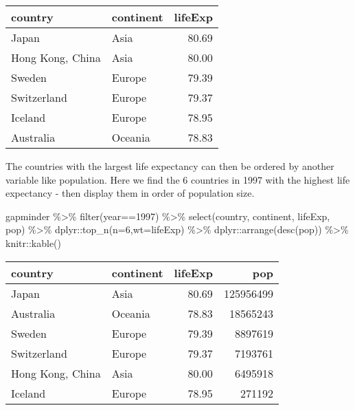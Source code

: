 \documentclass[
]{book}
\newenvironment{Shaded}{\begin{snugshade}}{\end{snugshade}}
\newcommand{\AttributeTok}[1]{\textcolor[rgb]{0.77,0.63,0.00}{#1}}
\newcommand{\DecValTok}[1]{\textcolor[rgb]{0.00,0.00,0.81}{#1}}
\newcommand{\FunctionTok}[1]{\textcolor[rgb]{0.00,0.00,0.00}{#1}}
\newcommand{\NormalTok}[1]{#1}
\newcommand{\SpecialCharTok}[1]{\textcolor[rgb]{0.00,0.00,0.00}{#1}}
\begin{document}
\begin{tabular}{l|l|r}
\hline
country & continent & lifeExp\\
\hline
Japan & Asia & 80.69\\
\hline
Hong Kong, China & Asia & 80.00\\
\hline
Sweden & Europe & 79.39\\
\hline
Switzerland & Europe & 79.37\\
\hline
Iceland & Europe & 78.95\\
\hline
Australia & Oceania & 78.83\\
\hline
\end{tabular}

The countries with the largest life expectancy can then be ordered by another variable like population. Here we find the 6 countries in 1997 with the highest life expectancy - then display them in order of population size.

\begin{Shaded}
\begin{Highlighting}[]
\NormalTok{gapminder }\SpecialCharTok{\%\textgreater{}\%} 
  \FunctionTok{filter}\NormalTok{(year}\SpecialCharTok{==}\DecValTok{1997}\NormalTok{) }\SpecialCharTok{\%\textgreater{}\%}  
  \FunctionTok{select}\NormalTok{(country, continent, lifeExp, pop) }\SpecialCharTok{\%\textgreater{}\%}
\NormalTok{  dplyr}\SpecialCharTok{::}\FunctionTok{top\_n}\NormalTok{(}\AttributeTok{n=}\DecValTok{6}\NormalTok{,}\AttributeTok{wt=}\NormalTok{lifeExp) }\SpecialCharTok{\%\textgreater{}\%}
\NormalTok{  dplyr}\SpecialCharTok{::}\FunctionTok{arrange}\NormalTok{(}\FunctionTok{desc}\NormalTok{(pop)) }\SpecialCharTok{\%\textgreater{}\%}
\NormalTok{  knitr}\SpecialCharTok{::}\FunctionTok{kable}\NormalTok{()}
\end{Highlighting}
\end{Shaded}

\begin{tabular}{l|l|r|r}
\hline
country & continent & lifeExp & pop\\
\hline
Japan & Asia & 80.69 & 125956499\\
\hline
Australia & Oceania & 78.83 & 18565243\\
\hline
Sweden & Europe & 79.39 & 8897619\\
\hline
Switzerland & Europe & 79.37 & 7193761\\
\hline
Hong Kong, China & Asia & 80.00 & 6495918\\
\hline
Iceland & Europe & 78.95 & 271192\\
\hline
\end{tabular}
\end{document}
